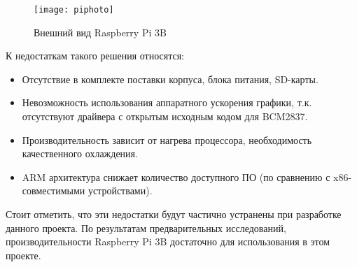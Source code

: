 \begin{figure}[h]
    \center
    \texttt{[image: piphoto]}
    \caption{Внешний вид Raspberry Pi 3B}
    \label{pic:piphoto}
\end{figure}

К недостаткам такого решения относятся:
\begin{itemize}
    \item Отсутствие в комплекте поставки корпуса, блока питания, SD-карты.
    \item Невозможность использования аппаратного ускорения графики, т.к. отсутствуют 
        драйвера с открытым исходным кодом для BCM2837.
    \item Производительность зависит от нагрева процессора, необходимость качественного
        охлаждения.
    \item ARM архитектура снижает количество доступного ПО (по сравнению с
        x86-совместимыми устройствами).
\end{itemize}

Стоит отметить, что эти недостатки будут частично устранены при разработке данного
проекта.
По результатам предварительных исследований, производительности Raspberry Pi 3B
достаточно для использования в этом проекте.
